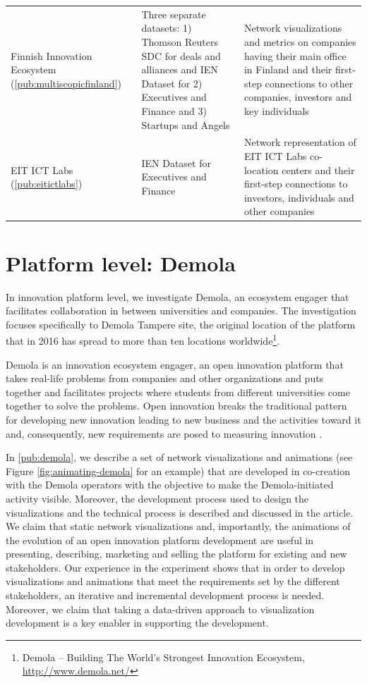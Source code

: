 \begin{tabular}{p{2.5cm} p{4cm} p{5.5cm}}
Finnish Innovation Ecosystem (\ref{pub:multiscopicfinland}) & 
Three separate datasets: 1) Thomson Reuters SDC for deals and alliances and IEN Dataset for 2) Executives and Finance and 3) Startups and Angels & 
Network visualizations and metrics on companies having their main office in Finland and their first-step connections to other companies, investors and key individuals \\

EIT ICT Labs (\ref{pub:eitictlabs}) & 
IEN Dataset for Executives and Finance	& 
Network representation of EIT ICT Labs co-location centers and their first-step connections to investors, individuals and other companies
\end{tabular}
\endgroup

\section{Platform level: Demola}

In innovation platform level, we investigate Demola, an ecosystem engager that facilitates collaboration in between universities and companies. The investigation focuses specifically to Demola Tampere site, the original location of the platform that in 2016 has spread to more than ten locations worldwide\footnote{Demola – Building The World’s Strongest Innovation Ecosystem, \url{http://www.demola.net/}}.

Demola is an innovation ecosystem engager, an open innovation platform that takes real-life problems from companies and other organizations and puts together and facilitates projects where students from different universities come together to solve the problems. Open innovation breaks the traditional pattern for developing new innovation leading to new business and the activities toward it and, consequently, new requirements are posed to measuring innovation \citep[cf.][]{Still2012ParadigmDigital}. 

In \ref{pub:demola}, we \citep{Huhtamaki2013ProcessDemola} describe a set of network visualizations and animations (see Figure \ref{fig:animating-demola} for an example) that are developed in co-creation with the Demola operators with the objective to make the Demola-initiated activity visible. Moreover, the development process used to design the visualizations and the technical process is described and discussed in the article. We claim that static network visualizations and, importantly, the animations of the evolution of an open innovation platform development are useful in presenting, describing, marketing and selling the platform for existing and new stakeholders. Our experience in the experiment shows that in order to develop visualizations and animations that meet the requirements set by the different stakeholders, an iterative and incremental development process is needed. Moreover, we claim that taking a data-driven approach to visualization development is a key enabler in supporting the development.

